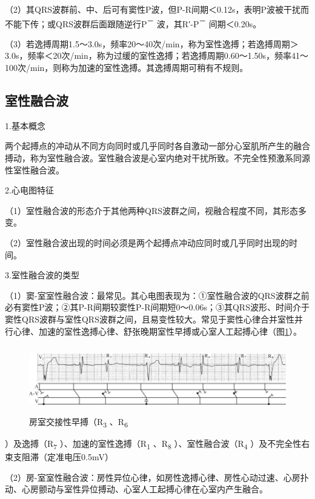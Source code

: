 （2）其QRS波群前、中、后可有窦性P波，但P-R间期＜0.12s，表明P波被干扰而不能下传；或QRS波群后面跟随逆行P\textsuperscript{－}
波，其R′-P\textsuperscript{－} 间期＜0.20s。

（3）若逸搏周期1.5～3.0s，频率20～40次/min，称为室性逸搏；若逸搏周期＞3.0s，频率＜20次/min，称为过缓的室性逸搏；若逸搏周期0.60～1.50s，频率41～100次/min，则称为加速的室性逸搏。其逸搏周期可稍有不规则。

\protect\hypertarget{text00009.htmlux5cux23subid61}{}{}

\subsection{室性融合波}

1.基本概念

两个起搏点的冲动从不同方向同时或几乎同时各自激动一部分心室肌所产生的融合搏动，称为室性融合波。室性融合波是心室内绝对干扰所致。不完全性预激系同源性室性融合波。

2.心电图特征

（1）室性融合波的形态介于其他两种QRS波群之间，视融合程度不同，其形态多变。

（2）室性融合波出现的时间必须是两个起搏点冲动应同时或几乎同时出现的时间。

3.室性融合波的类型

（1）窦-室室性融合波：最常见。其心电图表现为：①室性融合波的QRS波群之前必有窦性P波；②其P-R间期较窦性P-R间期短0～0.06s；③其QRS波形、时间介于窦性QRS波群与室性QRS波群之间，且易变性较大。常见于窦性心律合并室性并行心律、加速的室性逸搏心律、舒张晚期室性早搏或心室人工起搏心律（图\ref{fig3-17}）。

\begin{figure}[!htbp]
 \centering
 \includegraphics[width=5.78125in,height=1.15625in]{./images/Image00067.jpg}
 \captionsetup{justification=centering}
 \caption{房室交接性早搏（R\textsubscript{3} 、R\textsubscript{6}}
 \label{fig3-17}
  \end{figure} 
）及逸搏（R\textsubscript{7} ）、加速的室性逸搏（R\textsubscript{1}
、R\textsubscript{8} ）、室性融合波（R\textsubscript{4}
）及不完全性右束支阻滞（定准电压0.5mV）

（2）房-室室性融合波：房性异位心律，如房性逸搏心律、房性心动过速、心房扑动、心房颤动与室性异位搏动、心室人工起搏心律在心室内产生融合。

